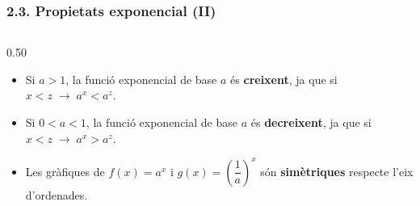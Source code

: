 \documentclass[aspectratio=169]{beamer}
\begin{document}
\begin{frame}[t]
  \frametitle{2.3. Propietats exponencial (II)}

  \vspace{-0.25cm}
  \small
  \setlength{\itemsep}{0.06em}
  \setlength{\topsep}{0.06em}

  \begin{columns}[T,onlytextwidth]
    \begin{column}{0.50\textwidth}
      \begin{minipage}[t][4.85cm]{\columnwidth}
        \begin{itemize}
          \item<1-> Si \(a>1\), la funció exponencial de base \(a\) és \textbf{creixent}, ja que si \(x<z \;\rightarrow\; a^x<a^z\).
          \item<4-> Si \(0<a<1\), la funció exponencial de base \(a\) és \textbf{decreixent}, ja que si \(x<z \;\rightarrow\; a^x>a^z\).
          \item<7-> Les gràfiques de \(f(x)=a^x\) i \(g(x)=\left(\dfrac{1}{a}\right)^x\) són \textbf{simètriques} respecte l'eix d'ordenades.
        \end{itemize}
      \end{minipage}
    \end{column}


\end{columns}
\end{frame}
\end{document}
